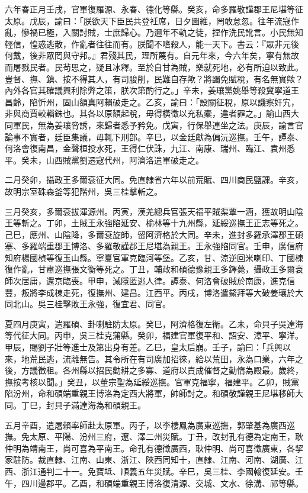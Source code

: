 \begin{pinyinscope}
六年春正月壬戌，官軍復羅源、永春、德化等縣。癸亥，命多羅敬謹郡王尼堪等征太原。戊辰，諭曰：「朕欲天下臣民共登衽席，日夕圖維，罔敢怠忽。往年流寇作亂，慘禍已極，入關討賊，士庶歸心。乃邇年不軌之徒，捏作洗民訛言。小民無知輕信，惶惑逃散，作亂者往往而有。朕聞不嗜殺人，能一天下。書云：『眾非元後何戴，後非眾罔與守邦。』君殘其民，理所蔑有。自元年來，今六年矣，寧有無故而屠戮民者。民茍思之，疑且冰釋。至於自甘為賊，樂就死地，必有所迫以致此。豈督、撫、鎮、按不得其人，有司朘削，民難自存歟？將蠲免賦稅，有名無實歟？內外各官其確議興利除弊之策，朕次第酌行之。」辛未，姜瓖黨姚舉等殺冀寧道王昌齡，陷忻州，固山額真阿賴破走之。乙亥，諭曰：「設關征稅，原以譏察奸宄，非與商賈較輜銖也。其各以原額起稅，毋得橫徵以充私橐，違者罪之。」諭山西大同軍民，無為姜瓖脅誘，來歸者悉予矜免。戊寅，行保舉連坐之法。庚辰，諭言官論事不實者，廷臣集議，毋輒下刑部。辛巳，以金廷獻為偏沅巡撫。壬午，譚泰、何洛會復南昌，金聲桓投水死，王得仁伏誅，九江、南康、瑞州、臨江、袁州悉平。癸未，山西賊黨劉遷寇代州，阿濟洛遣軍破走之。

二月癸卯，攝政王多爾袞征大同。免直隸省六年以前荒賦、四川商民鹽課。辛亥，故明宗室硃森釜等犯階州，吳三桂擊斬之。

三月癸亥，多爾袞拔渾源州。丙寅，漢羌總兵官張天福平賊渠覃一涵，獲故明山陰王等斬之。丁卯，土賊王永強陷延安、榆林等十九州縣，延綏巡撫王正志等死之。己巳，應州、山陰降，多爾袞旋師，留阿濟格於大同。辛未，進封多羅承澤郡王碩塞、多羅端重郡王博洛、多羅敬謹郡王尼堪為親王。王永強陷同官。壬申，廣信府知府楊國楨等復玉山縣。寧夏官軍克臨河等堡。乙亥，甘、涼逆回米喇印、丁國棟復作亂，甘肅巡撫張文衡等死之。丁丑，輔政和碩德豫親王多鐸薨，攝政王多爾袞師次居庸，還京臨喪。甲申，減隱匿逃人律。譚泰、何洛會破賊於南康，進克信豐，叛將李成棟走死，復撫州、建昌。江西平。丙戌，博洛遣鰲拜等大破姜瓖於大同北山。吳三桂擊敗王永強，復宜君、同官。

夏四月庚寅，遣羅碩、卦喇駐防太原。癸巳，阿濟格復左衛。乙未，命貝子吳達海等代征大同。丙申，吳三桂克蒲縣。癸卯，福建官軍復平和、詔安、漳平、寧洋。甲辰，賜劉子壯等進士及第出身有差。乙巳，皇太后崩。壬子，諭曰：「兵興以來，地荒民逃，流離無告。其令所在有司廣加招徠，給以荒田，永為口業，六年之後，方議徵租。各州縣以招民勸耕之多寡、道府以責成催督之勤惰為殿最。歲終，撫按考核以聞。」癸丑，以董宗聖為延綏巡撫。官軍克福寧，福建平。乙卯，賊黨陷汾州，命和碩端重親王博洛為定西大將軍，帥師討之。和碩敬謹親王尼堪移師大同。丁巳，封貝子滿達海為和碩親王。

五月辛酉，遣屠賴率師赴太原軍。丙子，以李棲鳳為廣東巡撫，郭肇基為廣西巡撫。免太原、平陽、汾州三府，遼、澤二州災賦。丁丑，改封孔有德為定南王，耿仲明為靖南王，尚可喜為平南王。命孔有德徵廣西，耿仲明、尚可喜徵廣東，各挈家駐防。裁直隸、江南、山東、浙江、陜西同知十，直隸、江南、河南、湖廣、江西、浙江通判二十一。免寶坻、順義五年災賦。辛巳，吳三桂、李國翰復延安。壬午，四川邊郡平。乙酉，和碩端重親王博洛復清源、交城、文水、徐溝、祁等縣。


\end{pinyinscope}
